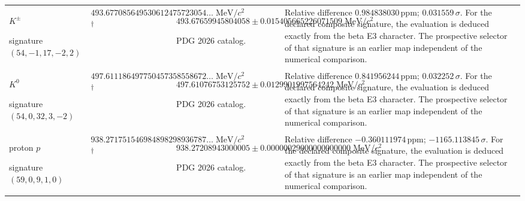\begin{longtable}{@{}>{\raggedright\arraybackslash}p{}>{\raggedright\arraybackslash}p{}>{\raggedright\arraybackslash}p{}>{\raggedright\arraybackslash}p{}@{}}
$K^\pm$\par signature $(54,\allowbreak -1,\allowbreak 17,\allowbreak -2,\allowbreak 2)$ & $493.677085\allowbreak{}649530\allowbreak{}612475\allowbreak{}723054\ldots\;\mathrm{MeV}/c^2$\textsuperscript{\(\dagger\)} & $493.676599\allowbreak{}458040\allowbreak{}58\pm 0.015405\allowbreak{}665226\allowbreak{}071509\;\mathrm{MeV}/c^2$\par\footnotesize PDG 2026 catalog. & Relative difference $0.984838\allowbreak{}030\,\mathrm{ppm}$; $0.031559\,\sigma$. For the declared composite signature, the evaluation is deduced exactly from the beta E3 character. The prospective selector of that signature is an earlier map independent of the numerical comparison. \\
$K^0$\par signature $(54,\allowbreak 0,\allowbreak 32,\allowbreak 3,\allowbreak -2)$ & $497.611186\allowbreak{}497750\allowbreak{}457358\allowbreak{}558672\ldots\;\mathrm{MeV}/c^2$\textsuperscript{\(\dagger\)} & $497.610767\allowbreak{}531257\allowbreak{}52\pm 0.012990\allowbreak{}199756\allowbreak{}4242\;\mathrm{MeV}/c^2$\par\footnotesize PDG 2026 catalog. & Relative difference $0.841956\allowbreak{}244\,\mathrm{ppm}$; $0.032252\,\sigma$. For the declared composite signature, the evaluation is deduced exactly from the beta E3 character. The prospective selector of that signature is an earlier map independent of the numerical comparison. \\
proton $p$\par signature $(59,\allowbreak 0,\allowbreak 9,\allowbreak 1,\allowbreak 0)$ & $938.271751\allowbreak{}546984\allowbreak{}898298\allowbreak{}936787\ldots\;\mathrm{MeV}/c^2$\textsuperscript{\(\dagger\)} & $938.272089\allowbreak{}430000\allowbreak{}05\pm 0.000000\allowbreak{}290000\allowbreak{}000000\allowbreak{}00\;\mathrm{MeV}/c^2$\par\footnotesize PDG 2026 catalog. & Relative difference $-0.360111\allowbreak{}974\,\mathrm{ppm}$; $-1165.113845\,\sigma$. For the declared composite signature, the evaluation is deduced exactly from the beta E3 character. The prospective selector of that signature is an earlier map independent of the numerical comparison. \\

\end{longtable}
